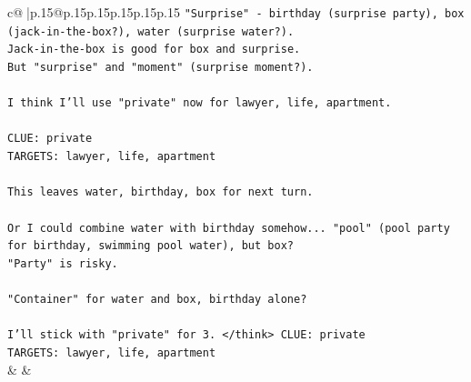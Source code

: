 \documentclass{article}
\begin{document}
{\begin{supertabular}{c@{$\;$}|p{.15\linewidth}@{}p{.15\linewidth}p{.15\linewidth}p{.15\linewidth}p{.15\linewidth}p{.15\linewidth}}
{{{\texttt{"Surprise" {-} birthday (surprise party), box (jack{-}in{-}the{-}box?), water (surprise water?).} \\
\texttt{Jack{-}in{-}the{-}box is good for box and surprise.} \\
\texttt{But "surprise" and "moment" (surprise moment?).} \\
\\ 
\texttt{I think I'll use "private" now for lawyer, life, apartment.} \\
\\ 
\texttt{CLUE: private} \\
\texttt{TARGETS: lawyer, life, apartment} \\
\\ 
\texttt{This leaves water, birthday, box for next turn.} \\
\\ 
\texttt{Or I could combine water with birthday somehow... "pool" (pool party for birthday, swimming pool water), but box?} \\
\texttt{"Party" is risky.} \\
\\ 
\texttt{"Container" for water and box, birthday alone?} \\
\\ 
\texttt{I'll stick with "private" for 3. </think> CLUE: private} \\
\texttt{TARGETS: lawyer, life, apartment} \\
            }
        }
    }
    & & \\ \\


\end{supertabular}}
\end{document}
